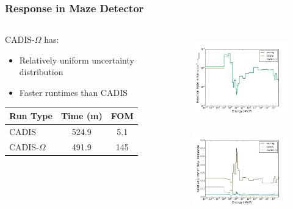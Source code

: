 \documentclass[xcolor=x11names,compress]{beamer}
\renewcommand{\(}{\begin{columns}}
\renewcommand{\)}{\end{columns}}
\newcommand{\<}[1]{\begin{column}{#1}}
\renewcommand{\>}{\end{column}}
\begin{document}
%
\begin{frame}[fragile]
  \frametitle{Response in Maze Detector}
  
\begin{columns}
  \begin{column}{0.45\textwidth}
  CADIS-$\Omega$ has:
  \begin{itemize}
    \item Relatively uniform uncertainty distribution
    \item Faster runtimes than CADIS
  \end{itemize}
  \vspace*{.5em}
  \begin{tabular}{|l|c c|}
  \hline
      Run Type & Time (m) & FOM \\  
      \hline
      CADIS  & 524.9  &  5.1 \\
      CADIS-$\Omega$ & 491.9 & 145 \\
      \hline
  \end{tabular}
  \end{column}
  \begin{column}{0.55\textwidth}
  	\begin{figure}
  	\begin{center}
  		\includegraphics[height=1.5in,clip]{../figs/maze-results.png}\\
  		\includegraphics[height=1.5in,clip]{../figs/maze-re.png}
	\end{center}
  	\end{figure}
  \end{column}
\end{columns}
\end{frame}
\end{document}
